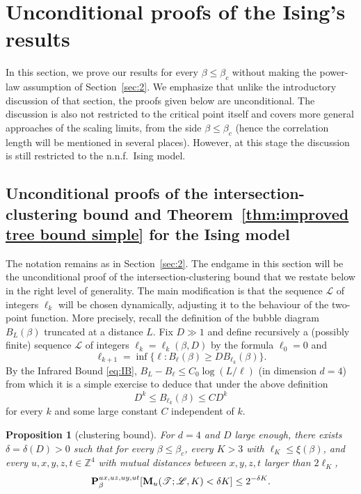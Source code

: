 \documentclass[a4paper,oneside,11pt]{article}
\def\Z{\mathbb{Z}}                          %
\newtheorem{proposition}[theorem]{Proposition}
\newcommand{\be}[1]{\begin{equation}\label{#1}}
\newcommand{\ee}{\end{equation}}
\numberwithin{equation}{section}
\numberwithin{equation}{section}
\numberwithin{equation}{section}
\newcommand{\calL}{\mathcal{L}}
\newcommand{\calT}{\mathcal{T}}
\def\Z{\mathbb{Z}}                          %
\def\be{\begin{equation}}
\def\ee{\end{equation}}
\begin{document}
\section{Unconditional proofs of the Ising's results}\label{sec:4}

In this section, we prove our results for every $\beta\le\beta_c$ without making the power-law assumption of Section~\ref{sec:2}.   We emphasize that unlike the introductory discussion of that  section, the proofs given below are unconditional.  The discussion is also not restricted to the critical point itself and covers more general approaches of the scaling limits, from the side $\beta\leq \beta_c$ (hence the correlation length will be mentioned in several places).  However, at this stage the discussion is still restricted to the n.n.f.~Ising model.

\subsection{Unconditional proofs of the intersection-clustering bound and Theorem~\ref{thm:improved tree bound simple} for the Ising model}\label{sec:4.1}

The notation remains  as in Section~\ref{sec:2}. The endgame in this section will be the unconditional proof of the intersection-clustering bound  that we restate below in the right level of generality. The main modification is that the sequence $\calL$ of integers $\ell_k$ will be   chosen dynamically, adjusting it to the behaviour of the two-point function. More precisely, recall the definition of the bubble diagram $B_L(\beta)$ truncated at a distance $L$. Fix $D\gg1$ and define recursively a (possibly finite) sequence $\mathcal L$ of integers $\ell_k=\ell_k(\beta,D)$ by the formula $\ell_0=0$ and
\be\label{eq:def ell}
\ell_{k+1}=\inf\{\ell:B_\ell(\beta)\ge DB_{\ell_k}(\beta)\}.
\ee
By the Infrared Bound \eqref{eq:IB}, $B_L-B_\ell \leq C_0\log(L/\ell)$ (in  dimension $d=4$) from which it is a simple exercise to deduce that under the above definition 
\be 
D^k\le B_{\ell_k}(\beta)\le CD^k 
\ee 
 for every $k$ and some large constant $C$ independent of $k$.

\begin{proposition}[clustering bound]\label{prop:non isolated general}  
 For $d=4$ and $D$ large enough, there exists $\delta=\delta(D)>0$ such that  for every $\beta\le\beta_c$,  every $K>3$ with $\ell_K\le \xi(\beta)$, and every $u,x,y,z,t\in\Z^4$ with mutual distances between $x,y,z,t$ larger than $2\ell_{K}$,
\be \label{eq_cluster}
{\bf P}^{ux,uz,uy,ut}_\beta[{\bf M}_{u}(\calT; \mathcal L, K)< \delta K]\le 2^{-\delta K}.
\ee 
\end{proposition}
\end{document}
